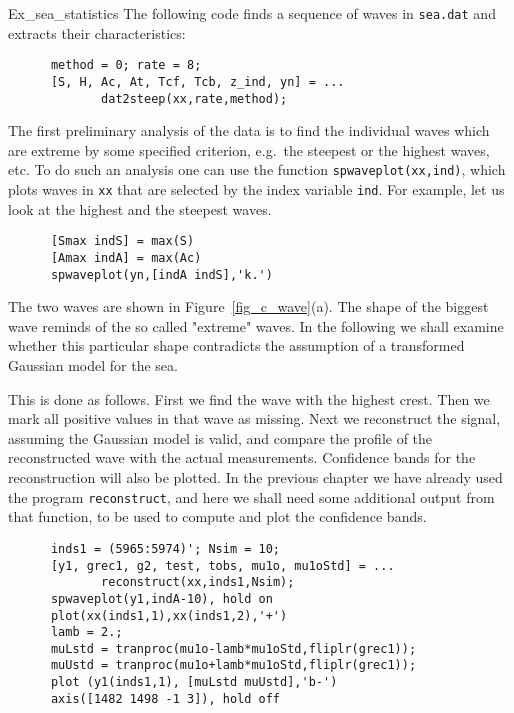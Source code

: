 \begin{cex}{Ex_sea_statistics}
The following code  finds a sequence of waves in {\tt sea.dat} and extracts 
their characteristics:
{\small\begin{verbatim}
      method = 0; rate = 8;
      [S, H, Ac, At, Tcf, Tcb, z_ind, yn] = ...
             dat2steep(xx,rate,method);
\end{verbatim}}

The first preliminary analysis of the data is to find the individual waves
which are extreme by some specified criterion, e.g.\ the steepest or the
highest waves, etc. To do such an analysis one can use the function
{\tt spwaveplot(xx,ind)}, which plots
waves in {\tt xx} that are selected by the index variable {\tt ind}.
For example, let us look at the highest and the steepest waves.
{\small\begin{verbatim}
      [Smax indS] = max(S)
      [Amax indA] = max(Ac)
      spwaveplot(yn,[indA indS],'k.')
\end{verbatim}}

The two waves are shown in Figure~\ref{fig_c_wave}(a). The  shape of
the biggest wave reminds of the so called "extreme" waves.
In the following we shall examine whether this particular shape contradicts
the assumption of a transformed Gaussian model for the sea.

This is done as follows. First we find the wave with the highest crest.
Then we mark all positive values in that wave as missing.
Next we reconstruct the signal, assuming the Gaussian model is valid,
and compare the profile of the reconstructed wave with the actual
measurements.
Confidence bands for the reconstruction will also be plotted.
In the previous chapter we have already used the program
{\tt reconstruct},  and here
we shall need some additional output from that function, to be used to
compute and plot the confidence bands.
{\small\begin{verbatim}
      inds1 = (5965:5974)'; Nsim = 10;
      [y1, grec1, g2, test, tobs, mu1o, mu1oStd] = ...
             reconstruct(xx,inds1,Nsim);
      spwaveplot(y1,indA-10), hold on
      plot(xx(inds1,1),xx(inds1,2),'+')
      lamb = 2.;
      muLstd = tranproc(mu1o-lamb*mu1oStd,fliplr(grec1));
      muUstd = tranproc(mu1o+lamb*mu1oStd,fliplr(grec1));
      plot (y1(inds1,1), [muLstd muUstd],'b-')
      axis([1482 1498 -1 3]), hold off
\end{verbatim}}


\end{cex}
